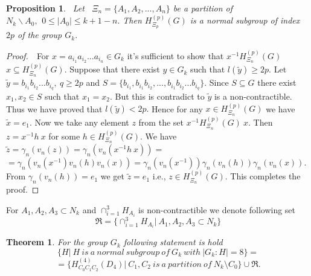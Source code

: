 \documentclass[12pt,reqno]{amsart}
\newtheorem{thm}{Theorem}
\newtheorem{pro}{Proposition}
\numberwithin{equation}{section}
\begin{document}
\begin{pro}\label{p3.} \ Let \ $\Xi_{n}=\{A_{1}, A_{2},...,A_{n}\}$ be a partition of
$N_{k}\backslash A_{0}, \,\ 0\leq|A_{0}|\leq k+1-n.$ Then
$H^{(p)}_{\Xi_{p}}(G)$ is a normal subgroup of index $2p$ of the
group $G_{k}.$\end{pro}
\begin{proof} \,\  For $x=a_{i_{1}}a_{i_{2}}...a_{i_{n}}\in G_{k}$
it's sufficient to show that $x^{-1}H^{(p)}_{\Xi_{n}}(G)$
$x\subseteq H^{(p)}_{\Xi_{n}}(G).$ Suppose that there exist $y\in
G_{k}$ such that $l(\tilde{y})\geq 2p.$ Let
$\tilde{y}=b_{i_{1}}b_{i_{2}}...b_{i_{q}}, \ q\geq 2p$ and
$S=\{b_{i_{1}}, b_{i_{1}}b_{i_{2}},...,
b_{i_{1}}b_{i_{2}}...b_{i_{q}}\}.$ Since $S\subseteq G$ there
exist $x_{1}, x_{2} \in S$ such that $x_{1}=x_{2}.$ But this is
contradict to $\tilde{y}$ is a non-contractible. Thus we have
proved that $l(\tilde{y})<2p.$ Hence for any $x\in
H^{(p)}_{\Xi_{n}}(G)$ we have $\tilde{x}=e_{1}.$ Now we take any
element $z$ from the set $x^{-1}H^{(p)}_{\Xi_{n}}(G)\ x.$ Then
$z=x^{-1}h\ x$ for some $h\in H^{(p)}_{\Xi_{n}}(G).$ We have
 $\tilde{z}=\gamma_{n}(v_{n}(z))=\gamma_{n}\left(v_{n}(x^{-1}h\ x)\right)=$
 $=\gamma_{n}\left(v_{n}(x^{-1})v_{n}(h)v_{n}(x)\right)=
 \gamma_{n}\left(v_{n}(x^{-1})\right)\gamma_{n}\left(v_{n}(h)\right)\gamma_{n}\left(v_{n}(x)\right).$
From $\gamma_{n}\left(v_{n}(h)\right)=e_{1}$ we get
$\tilde{z}=e_{1}$ i.e., $z\in H^{(p)}_{\Xi_{n}}(G).$ This
completes the proof.\end{proof}

 For $A_{1},A_{2},A_{3}\subset N_{k}$ and $\cap_{i=1}^{3}H_{A_{i}}$
is non-contractible we denote following set\\
$$\Re=\{\cap_{i=1}^{3}H_{A_{i}}|
\ A_{1},A_{2},A_{3}\subset N_{k}\}$$

\begin{thm}\label{th1}  For the group
$G_{k}$ following statement is hold\\
 $$\{H|\ H \ is\ a\ normal\
subgroup\ of\ G_{k}\ with\ |G_{k}:H|=8\}=$$
$$=\{H^{(4)}_{C_{0}C_{1}C_{2}}(D_{4})|\ C_{1},C_{2}\ is\ a\
partition\ of\ N_{k}\setminus C_{0}\} \cup \Re.$$
\end{thm}
\end{document}
